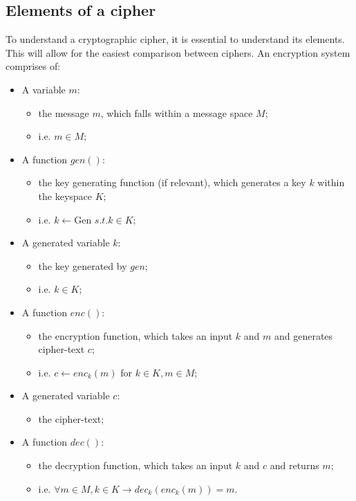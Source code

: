 \documentclass{AIAA}
\begin{document}
\subsection{Elements of a cipher}
To understand a cryptographic cipher, it is essential to understand its elements. This will allow for the easiest comparison between ciphers. An encryption system comprises of:
\begin{itemize}
	\item A variable $m$:
    \begin{itemize}
    	\item the message $m$, which falls within a message space $M$;
        \item i.e. $m \in M$;
    \end{itemize}
    \item A function $gen()$:
    \begin{itemize}
    	\item the key generating function (if relevant), which generates a key $k$ within the keyspace $K$;
        \item i.e. $k \longleftarrow $Gen $s.t. k \in K$;
    \end{itemize}
    \item A generated variable $k$:
    \begin{itemize}
    	\item the key generated by $gen$;
        \item i.e. $k \in K$;
    \end{itemize}
    \item A function $enc()$:
    \begin{itemize}
    	\item the encryption function, which takes an input $k$ and $m$ and generates cipher-text $c$;
        \item i.e. $c \longleftarrow enc_{k}(m)$ for $k \in K, m \in M$;
    \end{itemize}
    \item A generated variable $c$:
    \begin{itemize}
    	\item the cipher-text;
    \end{itemize}
    \item A function $dec()$:
    \begin{itemize}
    	\item the decryption function, which takes an input $k$ and $c$ and returns $m$;
        \item i.e. $\forall m \in M, k \in K \longrightarrow dec_{k}(enc_{k}(m))=m$.
    \end{itemize}
\end{itemize}
\end{document}
